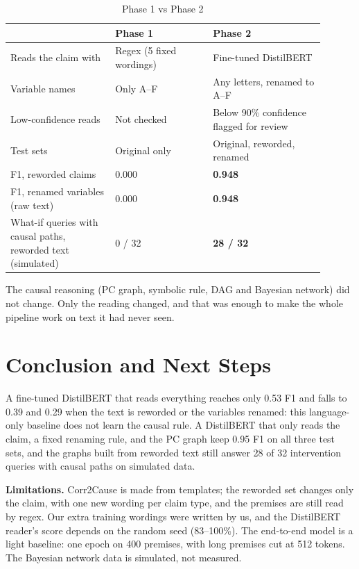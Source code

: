 \documentclass[conference]{IEEEtran}
\begin{document}
\begin{table}[t]
\centering
\caption{Phase 1 vs Phase 2}
\label{tab:improved}
\footnotesize
\setlength{\tabcolsep}{3pt}
\begin{tabular}{p{0.30\linewidth}p{0.28\linewidth}p{0.32\linewidth}}
\toprule
 & Phase 1 & Phase 2 \\
\midrule
Reads the claim with & Regex (5 fixed wordings) & Fine-tuned DistilBERT \\
Variable names & Only A--F & Any letters, renamed to A--F \\
Low-confidence reads & Not checked & Below 90\% confidence flagged for review \\
Test sets & Original only & Original, reworded, renamed \\
F1, reworded claims & 0.000 & \textbf{0.948} \\
F1, renamed variables (raw text) & 0.000 & \textbf{0.948} \\
What-if queries with causal paths, reworded text (simulated) & 0 / 32 & \textbf{28 / 32} \\
\bottomrule
\end{tabular}
\end{table}

The causal reasoning (PC graph, symbolic rule, DAG and Bayesian network) did not change. Only the reading changed,
and that was enough to make the whole pipeline work on text it had never seen.

\section{Conclusion and Next Steps}
A fine-tuned DistilBERT that reads everything reaches only 0.53 F1 and falls to 0.39 and 0.29 when the text is
reworded or the variables renamed: this language-only baseline does not learn the causal rule. A DistilBERT that only reads the claim,
a fixed renaming rule, and the PC graph keep 0.95 F1 on all three test sets, and the graphs built from reworded text
still answer 28 of 32 intervention queries with causal paths on simulated data.

\textbf{Limitations.} Corr2Cause is made from templates; the reworded set changes only the claim, with one new
wording per claim type, and the premises are still read by regex. Our extra training wordings were written by us,
and the DistilBERT reader's score depends on the random seed (83--100\%). The end-to-end model is a light
baseline: one epoch on 400 premises, with long premises cut at 512 tokens. The Bayesian network data is simulated,
not measured.
\end{document}
